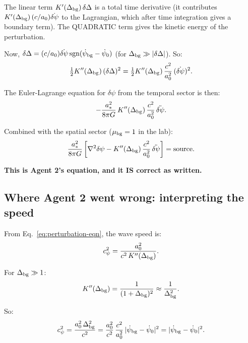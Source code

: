 \documentclass[11pt]{article}
\newcommand{\half}{\tfrac{1}{2}}
\newcommand{\dpsi}{\delta\psi}
\theoremstyle{definition}
\theoremstyle{remark}
\begin{document}
The linear term $K'(\Delta_{\rm bg})\,\delta\Delta$ is a total time
derivative (it contributes $K'(\Delta_{\rm bg})\,(c/a_0)\dot{\dpsi}$
to the Lagrangian, which after time integration gives a boundary term).
The QUADRATIC term gives the kinetic energy of the perturbation.

Now, $\delta\Delta = (c/a_0)\dot{\dpsi}\,\text{sgn}(\dot\psi_{\rm bg}
- \dot\psi_0)$ (for $\Delta_{\rm bg} \gg |\delta\Delta|$). So:
\begin{equation}
\half K''(\Delta_{\rm bg})\,(\delta\Delta)^2
= \half K''(\Delta_{\rm bg})\,\frac{c^2}{a_0^2}\,(\dot{\dpsi})^2.
\end{equation}

The Euler-Lagrange equation for $\dpsi$ from the temporal sector is then:
\begin{equation}
-\frac{a_*^2}{8\pi G}\,K''(\Delta_{\rm bg})\,\frac{c^2}{a_0^2}\,\ddot{\dpsi}.
\end{equation}

Combined with the spatial sector ($\mu_{\rm bg} = 1$ in the lab):
\begin{equation}
\frac{a_*^2}{8\pi G}\left[
  \nabla^2\dpsi - K''(\Delta_{\rm bg})\,\frac{c^2}{a_0^2}\,\ddot{\dpsi}
\right] = \text{source}.
\label{eq:perturbation-eqn}
\end{equation}

\textbf{This is Agent 2's equation, and it IS correct as written.}

\subsection{Where Agent 2 went wrong: interpreting the speed}

From Eq.~\eqref{eq:perturbation-eqn}, the wave speed is:
\begin{equation}
c_\psi^2 = \frac{a_0^2}{c^2\,K''(\Delta_{\rm bg})}.
\label{eq:cpsi-from-Kpp}
\end{equation}

For $\Delta_{\rm bg} \gg 1$:
\begin{equation}
K''(\Delta_{\rm bg}) = \frac{1}{(1+\Delta_{\rm bg})^2}
\approx \frac{1}{\Delta_{\rm bg}^2}.
\end{equation}

So:
\begin{equation}
c_\psi^2 = \frac{a_0^2\,\Delta_{\rm bg}^2}{c^2}
= \frac{a_0^2}{c^2}\,\frac{c^2}{a_0^2}\,|\dot\psi_{\rm bg} - \dot\psi_0|^2
= |\dot\psi_{\rm bg} - \dot\psi_0|^2.
\end{equation}
\end{document}
